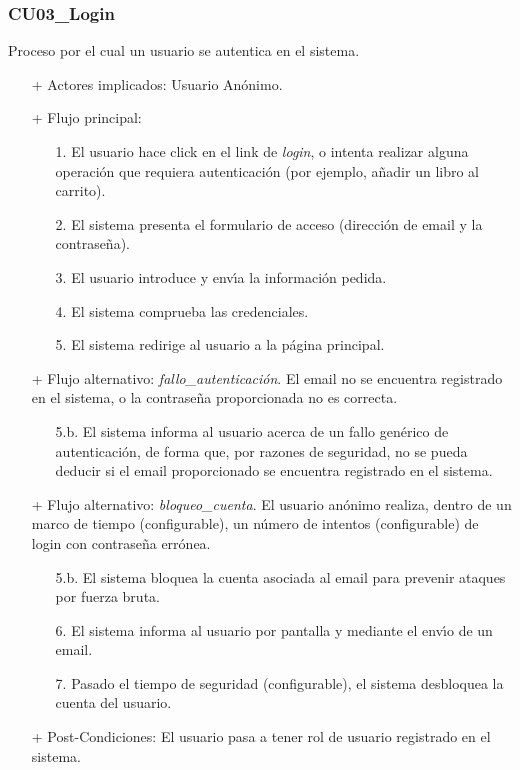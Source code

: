 \documentclass[a4paper]{report}
\begin{document}
            \subsubsection{CU03\_Login}
                Proceso por el cual un usuario se autentica en el sistema.
                \begin{itemize}
                    \item[+] Actores implicados: Usuario An\'onimo.
                    \item[+] Flujo principal:
                    \begin{enumerate}
                        \item[1.] El usuario hace click en el link de \emph{login}, o intenta realizar alguna operaci\'on
                        que requiera autenticaci\'on (por ejemplo, a\~nadir un libro al carrito).
                        \item[2.] El sistema presenta el formulario de acceso (direcci\'on de email y la contrase\~na).
                        \item[3.] El usuario introduce y env\'\i{}a la informaci\'on pedida.
                        \item[4.] El sistema comprueba las credenciales.
                        \item[5.] El sistema redirige al usuario a la p\'agina principal.
                    \end{enumerate}
                    \item[+] Flujo alternativo: \emph{fallo\_autenticaci\'on}. El email no se encuentra registrado en el sistema, o la contrase\~na proporcionada no es correcta.
                    \begin{itemize}
                        \item[5.b.] El sistema informa al usuario acerca de un fallo gen\'erico de autenticaci\'on, de forma que,
                        por razones de seguridad, no se pueda deducir si el email proporcionado se encuentra registrado en el sistema.
                    \end{itemize}
                    \item[+] Flujo alternativo: \emph{bloqueo\_cuenta}. El usuario an\'onimo realiza, dentro de un marco de tiempo (configurable), un n\'umero de intentos (configurable) de login con contrase\~na err\'onea.
                    \begin{itemize}
                        \item[5.b.] El sistema bloquea la cuenta asociada al email para prevenir ataques por fuerza bruta.
                        \item[6.] El sistema informa al usuario por pantalla y mediante el env\'\i{}o de un email.
                        \item[7.] Pasado el tiempo de seguridad (configurable), el sistema desbloquea la cuenta del usuario.
                    \end{itemize}
                    \item[+] Post-Condiciones: El usuario pasa a tener rol de usuario registrado en el sistema.
                \end{itemize}

    
\end{document}
